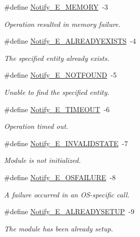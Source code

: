 \begin{DoxyCompactItemize}
\#define \hyperlink{_notify_8h_aa74af2d630f14ab3083a587ef0337184}{Notify\_\-E\_\-MEMORY}~-\/3
\begin{DoxyCompactList}\small\item\em Operation resulted in memory failure. \item\end{DoxyCompactList}\item 
\#define \hyperlink{_notify_8h_aea5c89c302ce37850d8819c85e29ce97}{Notify\_\-E\_\-ALREADYEXISTS}~-\/4
\begin{DoxyCompactList}\small\item\em The specified entity already exists. \item\end{DoxyCompactList}\item 
\#define \hyperlink{_notify_8h_a1c9a19382cfb8c48de9bc3e52e9f7635}{Notify\_\-E\_\-NOTFOUND}~-\/5
\begin{DoxyCompactList}\small\item\em Unable to find the specified entity. \item\end{DoxyCompactList}\item 
\#define \hyperlink{_notify_8h_a546b13cc1d684582073aaa256652fbc4}{Notify\_\-E\_\-TIMEOUT}~-\/6
\begin{DoxyCompactList}\small\item\em Operation timed out. \item\end{DoxyCompactList}\item 
\#define \hyperlink{_notify_8h_a14366d0247e7dda6144f851b60121125}{Notify\_\-E\_\-INVALIDSTATE}~-\/7
\begin{DoxyCompactList}\small\item\em Module is not initialized. \item\end{DoxyCompactList}\item 
\#define \hyperlink{_notify_8h_a62c9f5fc1a523a1d7efc2685c939a92b}{Notify\_\-E\_\-OSFAILURE}~-\/8
\begin{DoxyCompactList}\small\item\em A failure occurred in an OS-\/specific call. \item\end{DoxyCompactList}\item 
\#define \hyperlink{_notify_8h_abd83fd46add74de157a57a8458c67021}{Notify\_\-E\_\-ALREADYSETUP}~-\/9
\begin{DoxyCompactList}\small\item\em The module has been already setup. \item\end{DoxyCompactList}\item 

\end{DoxyCompactItemize}

